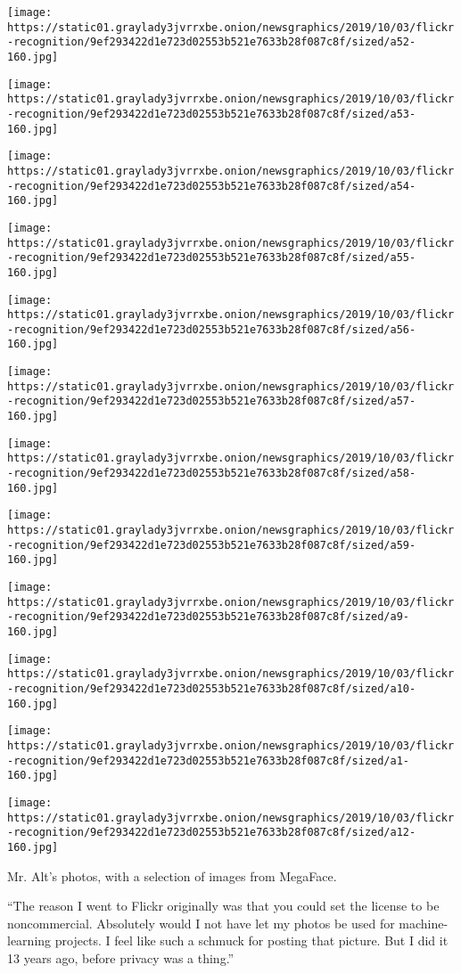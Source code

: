 \texttt{[image: https://static01.graylady3jvrrxbe.onion/newsgraphics/2019/10/03/flickr-recognition/9ef293422d1e723d02553b521e7633b28f087c8f/sized/a52-160.jpg]}

\texttt{[image: https://static01.graylady3jvrrxbe.onion/newsgraphics/2019/10/03/flickr-recognition/9ef293422d1e723d02553b521e7633b28f087c8f/sized/a53-160.jpg]}

\texttt{[image: https://static01.graylady3jvrrxbe.onion/newsgraphics/2019/10/03/flickr-recognition/9ef293422d1e723d02553b521e7633b28f087c8f/sized/a54-160.jpg]}

\texttt{[image: https://static01.graylady3jvrrxbe.onion/newsgraphics/2019/10/03/flickr-recognition/9ef293422d1e723d02553b521e7633b28f087c8f/sized/a55-160.jpg]}

\texttt{[image: https://static01.graylady3jvrrxbe.onion/newsgraphics/2019/10/03/flickr-recognition/9ef293422d1e723d02553b521e7633b28f087c8f/sized/a56-160.jpg]}

\texttt{[image: https://static01.graylady3jvrrxbe.onion/newsgraphics/2019/10/03/flickr-recognition/9ef293422d1e723d02553b521e7633b28f087c8f/sized/a57-160.jpg]}

\texttt{[image: https://static01.graylady3jvrrxbe.onion/newsgraphics/2019/10/03/flickr-recognition/9ef293422d1e723d02553b521e7633b28f087c8f/sized/a58-160.jpg]}

\texttt{[image: https://static01.graylady3jvrrxbe.onion/newsgraphics/2019/10/03/flickr-recognition/9ef293422d1e723d02553b521e7633b28f087c8f/sized/a59-160.jpg]}

\texttt{[image: https://static01.graylady3jvrrxbe.onion/newsgraphics/2019/10/03/flickr-recognition/9ef293422d1e723d02553b521e7633b28f087c8f/sized/a9-160.jpg]}

\texttt{[image: https://static01.graylady3jvrrxbe.onion/newsgraphics/2019/10/03/flickr-recognition/9ef293422d1e723d02553b521e7633b28f087c8f/sized/a10-160.jpg]}

\texttt{[image: https://static01.graylady3jvrrxbe.onion/newsgraphics/2019/10/03/flickr-recognition/9ef293422d1e723d02553b521e7633b28f087c8f/sized/a1-160.jpg]}

\texttt{[image: https://static01.graylady3jvrrxbe.onion/newsgraphics/2019/10/03/flickr-recognition/9ef293422d1e723d02553b521e7633b28f087c8f/sized/a12-160.jpg]}

Mr. Alt's photos, with a selection of images from MegaFace.

``The reason I went to Flickr originally was that you could set the
license to be noncommercial. Absolutely would I not have let my photos
be used for machine-learning projects. I feel like such a schmuck for
posting that picture. But I did it 13 years ago, before privacy was a
thing.''

